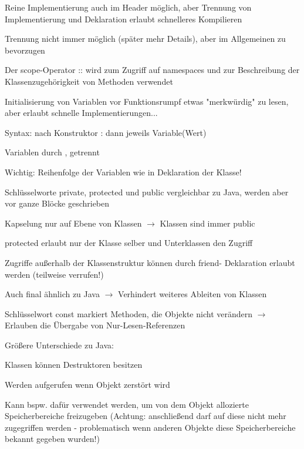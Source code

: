 \documentclass[10pt]{article}
\begin{document}
\begin{itemize*}
  \item Reine Implementierung auch im Header möglich, aber Trennung von Implementierung und Deklaration erlaubt schnelleres Kompilieren
  \item Trennung nicht immer möglich (später mehr Details), aber im Allgemeinen zu bevorzugen
  \item Der scope-Operator :: wird zum Zugriff auf namespaces und zur Beschreibung der Klassenzugehörigkeit von Methoden verwendet
  \item Initialisierung von Variablen vor Funktionsrumpf etwas "merkwürdig" zu lesen, aber erlaubt schnelle Implementierungen...
  \begin{itemize*}
    \item Syntax: nach Konstruktor : dann jeweils Variable(Wert)
    \item Variablen durch , getrennt
    \item Wichtig: Reihenfolge der Variablen wie in Deklaration der Klasse!
  \end{itemize*}
  \item Schlüsselworte private, protected und public vergleichbar zu Java, werden aber vor ganze Blöcke geschrieben
  \begin{itemize*}
    \item Kapselung nur auf Ebene von Klassen $\rightarrow$ Klassen sind immer public
    \item protected erlaubt nur der Klasse selber und Unterklassen den Zugriff
  \end{itemize*}
  \item Zugriffe außerhalb der Klassenstruktur können durch friend- Deklaration erlaubt werden (teilweise verrufen!)
  \item Auch final ähnlich zu Java $\rightarrow$ Verhindert weiteres Ableiten von Klassen
  \item Schlüsselwort const markiert Methoden, die Objekte nicht verändern $\rightarrow$ Erlauben die Übergabe von Nur-Lesen-Referenzen
  \item Größere Unterschiede zu Java:
  \begin{itemize*}
    \item Klassen können Destruktoren besitzen
    \begin{itemize*}
      \item Werden aufgerufen wenn Objekt zerstört wird
      \item Kann bspw. dafür verwendet werden, um von dem Objekt allozierte Speicherbereiche freizugeben (Achtung: anschließend darf auf diese nicht mehr zugegriffen werden - problematisch wenn anderen Objekte diese Speicherbereiche bekannt gegeben wurden!)

\end{itemize*}
\end{itemize*}
\end{itemize*}
\end{document}
